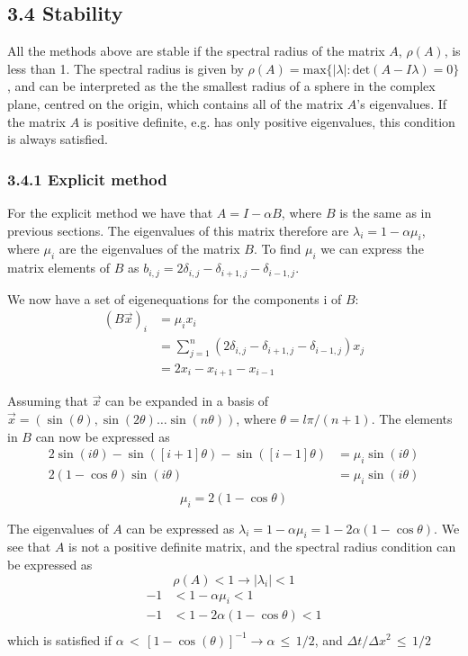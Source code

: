 \documentclass[a4paper,11pt]{report}
\begin{document}
\subsection*{3.4 Stability}

All the methods above are stable if the spectral radius of the matrix $A$, $\rho(A)$, is less than 1. The spectral radius is given by $\rho(A) = \mathrm{max}\{ |\lambda | : \mathrm{det}(A - I\lambda) = 0 \}$, and can be interpreted as the the smallest radius of a sphere in the complex plane, centred on the origin, which contains all of the matrix $A$'s eigenvalues. If the matrix $A$ is positive definite, e.g. has only positive eigenvalues, this condition is always satisfied. 

\subsubsection*{3.4.1 Explicit method}

For the explicit method we have that $A = I - \alpha B$, where \(B\) is the same as in previous sections. The eigenvalues of this matrix therefore are \( \lambda_i = 1 - \alpha \mu_i \), where \(\mu_i\) are the eigenvalues of the matrix \(B\). To find \(\mu_i\) we can express the matrix elements of \(B\) as \( b_ {i,j} = 2\delta_{i, j} - \delta_{i+1, j} - \delta_{i-1, j} \). 

We now have a set of eigenequations for the components i of \(B\): 
\begin{align*}
(B\vec{x})_i &= \mu_i x_i \\
&= \displaystyle \sum_{j=1}^n (2\delta_{i, j} - \delta_{i+1, j} - \delta_{i-1, j})x_j \\
&= 2x_i - x_{i+1} - x_{i-1}
\end{align*}

Assuming that $\vec{x}$ can be expanded in a basis of \( \vec{x} = (\sin(\theta), \sin(2\theta) \ldots \sin(n\theta)) \), where $\theta = l\pi/ (n+1)$. The elements in \(B\) can now be expressed as 
\begin{align*}
2\sin(i\theta) -\sin([i+1]\theta) - \sin([i-1]\theta) &= \mu_i \sin(i\theta)\\
2(1 - \cos\theta)\sin(i\theta) &= \mu_i \sin(i\theta)\\
\end{align*}\begin{equation} \label{eq:mu}
\mu_i = 2(1 - \cos\theta)
\end{equation}

The eigenvalues of \(A\) can be expressed as \( \lambda_i = 1 - \alpha \mu_i = 1 - 2\alpha(1 - \cos \theta)\). We see that \(A\) is not a positive definite matrix, and the spectral radius condition can be expressed as 
\[
\rho(A) < 1 \longrightarrow |\lambda_i| < 1 
\]\begin{align*}
-1 &< 1 - \alpha \mu_i < 1 \\
-1 &< 1 - 2\alpha(1 - \cos \theta) < 1 \\
\end{align*}
which is satisfied if \( \alpha \, < \, [1 - \cos(\theta)]^{-1} \longrightarrow \alpha \, \le \,  1/2  \), and \( \Delta t /\Delta x^2 \, \le \,  1/2 \)
\end{document}
